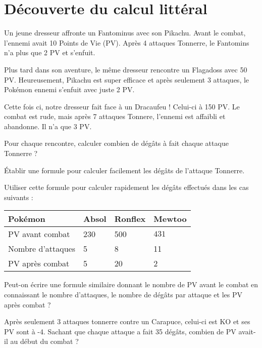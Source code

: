 \section*{Découverte du calcul littéral}


Un jeune dresseur affronte un Fantominus avec son Pikachu. 
Avant le combat, l'ennemi avait 10 Points de Vie (PV). Après 4 attaques Tonnerre, le Fantomins n'a plus que 2 PV et s'enfuit.

Plus tard dans son aventure, le même dresseur rencontre un Flagadoss avec 50 PV. Heureusement, Pikachu est super efficace et après seulement 3 attaques, le Pokémon ennemi s'enfuit avec juste 2 PV.

Cette fois ci, notre dresseur fait face à un Dracaufeu ! Celui-ci à 150 PV. Le combat est rude, mais après 7 attaques Tonnere, l'ennemi est affaibli et abandonne. Il n'a que 3 PV.

\cnt Pour chaque rencontre, calculer combien de dégâts à fait chaque attaque Tonnerre ?

\cnt Établir une formule pour calculer facilement les dégâts de l'attaque Tonnerre.

\cnt Utiliser cette formule pour calculer rapidement les dégâts effectués dans les cas suivants :

\vspace*{-1em}

\renewcommand{\arraystretch}{2}

\begin{tabularx}{\textwidth}{YYYY}
Pokémon & Absol & Ronflex & Mewtoo \\
\hline
PV avant combat & 230 & 500 & $431$  \\
\hline
Nombre d'attaques & 5 & 8 & 11 \\
\hline
PV après combat & 5 & 20 & 2
\end{tabularx}

\cnt Peut-on écrire une formule similaire donnant le nombre de PV avant le combat en connaissant le nombre d'attaques, le nombre de dégâts par attaque et les PV après combat ?

\cnt Après seulement 3 attaques tonnerre contre un Carapuce, celui-ci est KO et ses PV sont à -4. Sachant que chaque attaque a fait 35 dégâts, combien de PV avait-il au début du combat ?

\vspace*{-2em}